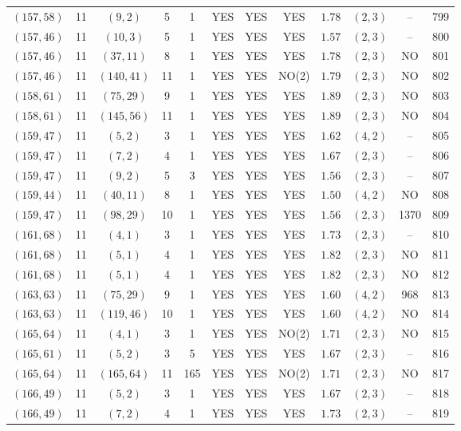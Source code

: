 \begin{longtable}{|c|c|c|c|c|c|c|c|c|c|c|c|}
$(157,58)$ & 11 & $(9,2)$ & 5 & 1 & YES & YES & YES & $1.78$ & $(2,3)$ & -- & 799\\
$(157,46)$ & 11 & $(10,3)$ & 5 & 1 & YES & YES & YES & $1.57$ & $(2,3)$ & -- & 800\\
$(157,46)$ & 11 & $(37,11)$ & 8 & 1 & YES & YES & YES & $1.78$ & $(2,3)$ & NO & 801\\
$(157,46)$ & 11 & $(140,41)$ & 11 & 1 & YES & YES & NO(2) & $1.79$ & $(2,3)$ & NO & 802\\
$(158,61)$ & 11 & $(75,29)$ & 9 & 1 & YES & YES & YES & $1.89$ & $(2,3)$ & NO & 803\\
$(158,61)$ & 11 & $(145,56)$ & 11 & 1 & YES & YES & YES & $1.89$ & $(2,3)$ & NO & 804\\
$(159,47)$ & 11 & $(5,2)$ & 3 & 1 & YES & YES & YES & $1.62$ & $(4,2)$ & -- & 805\\
$(159,47)$ & 11 & $(7,2)$ & 4 & 1 & YES & YES & YES & $1.67$ & $(2,3)$ & -- & 806\\
$(159,47)$ & 11 & $(9,2)$ & 5 & 3 & YES & YES & YES & $1.56$ & $(2,3)$ & -- & 807\\
$(159,44)$ & 11 & $(40,11)$ & 8 & 1 & YES & YES & YES & $1.50$ & $(4,2)$ & NO & 808\\
$(159,47)$ & 11 & $(98,29)$ & 10 & 1 & YES & YES & YES & $1.56$ & $(2,3)$ & 1370 & 809\\
$(161,68)$ & 11 & $(4,1)$ & 3 & 1 & YES & YES & YES & $1.73$ & $(2,3)$ & -- & 810\\
$(161,68)$ & 11 & $(5,1)$ & 4 & 1 & YES & YES & YES & $1.82$ & $(2,3)$ & NO & 811\\
$(161,68)$ & 11 & $(5,1)$ & 4 & 1 & YES & YES & YES & $1.82$ & $(2,3)$ & NO & 812\\
$(163,63)$ & 11 & $(75,29)$ & 9 & 1 & YES & YES & YES & $1.60$ & $(4,2)$ & 968 & 813\\
$(163,63)$ & 11 & $(119,46)$ & 10 & 1 & YES & YES & YES & $1.60$ & $(4,2)$ & NO & 814\\
$(165,64)$ & 11 & $(4,1)$ & 3 & 1 & YES & YES & NO(2) & $1.71$ & $(2,3)$ & NO & 815\\
$(165,61)$ & 11 & $(5,2)$ & 3 & 5 & YES & YES & YES & $1.67$ & $(2,3)$ & -- & 816\\
$(165,64)$ & 11 & $(165,64)$ & 11 & 165 & YES & YES & NO(2) & $1.71$ & $(2,3)$ & NO & 817\\
$(166,49)$ & 11 & $(5,2)$ & 3 & 1 & YES & YES & YES & $1.67$ & $(2,3)$ & -- & 818\\
$(166,49)$ & 11 & $(7,2)$ & 4 & 1 & YES & YES & YES & $1.73$ & $(2,3)$ & -- & 819\\

\end{longtable}
